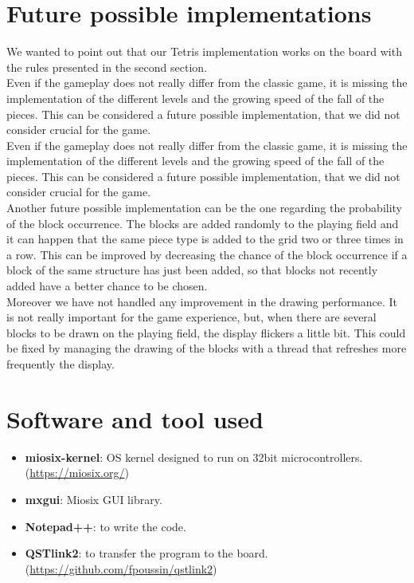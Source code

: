 \documentclass[18pt,oneside,a4paper, titlepage]{article}
\begin{document}
\newpage


\newpage
\section{Future possible implementations}
	We wanted to point out that our Tetris implementation works on the board with the rules presented in the second section.\\
	Even if the gameplay does not really differ from the classic game, it is missing the implementation of the different levels and the growing speed of the fall of the pieces. This can be considered a future possible implementation, that we did not consider crucial for the game.\\
	Even if the gameplay does not really differ from the classic game, it is missing the implementation of the different levels and the growing speed of the fall of the pieces. This can be considered a future possible implementation, that we did not consider crucial for the game.\\
	Another future possible implementation can be the one regarding the probability of the block occurrence. The blocks are added randomly to the playing field and it can happen that the same piece type is added to the grid two or three times in a row. This can be improved by decreasing the chance of the block occurrence if a block of the same structure has just been added, so that blocks not recently added have a better chance to be chosen.\\
	Moreover we have not handled any improvement in the drawing performance. It is not really important for the game experience, but, when there are several blocks to be drawn on the playing field, the display flickers a little bit. This could be fixed by managing the drawing of the blocks with a thread that refreshes more frequently the display.
	
\newpage
\section{Software and tool used}
	\begin{itemize}
		\item \textbf{miosix-kernel}: OS kernel designed to run on 32bit microcontrollers. (\url{https://miosix.org/})
		\item \textbf{mxgui}: Miosix GUI library.
		\item \textbf{Notepad++}: to write the code.
		\item \textbf{QSTlink2}: to transfer the program to the board. (\url{https://github.com/fpoussin/qstlink2})
	\end{itemize}
\end{document}
